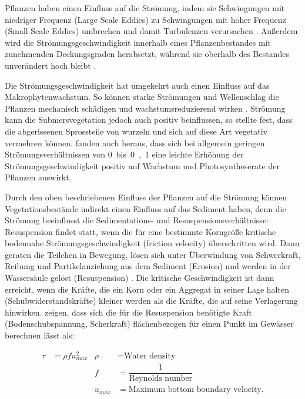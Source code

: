 Pflanzen haben einen Einfluss auf die Strömung, indem sie Schwingungen mit niedriger Frequenz (Large Scale Eddies) zu Schwingungen mit hoher Frequenz (Small Scale Eddies) umbrechen und damit Turbulenzen verursachen \citep{leonard_2006}. Außerdem wird die Strömungsgeschwindigkeit innerhalb eines Pflanzenbestandes mit zunehmenden Deckungsgraden herabsetzt, während sie oberhalb des Bestandes unverändert hoch bleibt \citep{li_2014}.

Die Strömungsgeschwindigkeit hat umgekehrt auch einen Einfluss auf das Makrophytenwachstum. So können starke Strömungen und Wellenschlag die Pflanzen mechanisch schädigen und wachstumsreduzierend wirken \citep{biggs_1996}. Strömung kann die Submersvegetation jedoch auch positiv beinflussen, so stellte \citep{madsen_1997} fest, dass die abgerissenen Sprossteile von  wurzeln und sich auf diese Art vegetativ vermehren können. \cite{madsen_1983} fanden auch heraus,  dass sich bei allgemein geringen Strömungsverhältnissen von \unit{0 bis 0,1}{\metre\per\second} eine leichte Erhöhung der Strömungsgeschwindigkeit  positiv auf Wachstum und Photosyntheserate der Pflanzen auswirkt.

Durch den oben beschriebenen Einfluss der Pflanzen auf die Strömung können Vegetationsbestände indirekt einen Einfluss auf das Sediment haben, denn die Strömung beeinflusst die Sedimentations- und Resuspensionsverhältnisse: 
Resuspension findet statt, wenn die für eine bestimmte Korngröße kritische bodennahe Strömungsgeschwindigkeit (friction velocity) überschritten wird. Dann geraten die Teilchen in Bewegung, lösen sich unter Überwindung von Schwerkraft, Reibung und Partikelanziehung aus dem Sediment (Erosion) und werden in der Wassersäule gelöst (Resuspension) \citep{madsen_2001, hartge_1991}. Die kritische Geschwindigkeit ist dann erreicht, wenn die Kräfte, die ein Korn oder ein Aggregat in seiner Lage halten (Schubwiderstandskräfte) kleiner werden als die Kräfte, die auf seine Verlagerung hinwirken. \cite{laenen_1996} zeigen, dass sich die für die Resuspension benötigte Kraft (Bodenschubspannung, Scherkraft) flächenbezogen für einen Punkt im Gewässer berechnen lässt als:

\begin{align*}
\tau &= \rho f u_{max}^{2} & \rho &=\text{Water density}\\ 
     &     				   &  f   &= \dfrac{1}{\text{Reynolds number}}\\
     &					   & u_{max} &= \text{Maximum bottom boundary velocity}.
\end{align*}


